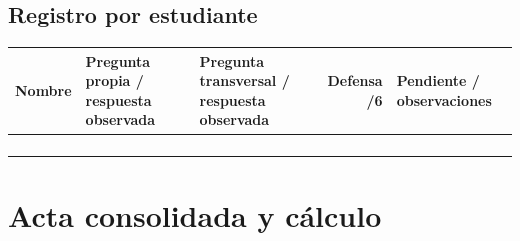 \documentclass[10pt, a4paper]{article}
\begin{document}
\subsection*{Registro por estudiante}

\begingroup
\scriptsize
\setlength{\tabcolsep}{3.5pt}
\renewcommand{\arraystretch}{1.85}
\noindent\begin{tabularx}{\textwidth}{|>{\hsize=0.75\hsize\raggedright\arraybackslash}X|>{\hsize=1.20\hsize\raggedright\arraybackslash}X|>{\hsize=1.20\hsize\raggedright\arraybackslash}X|r|>{\hsize=0.85\hsize\raggedright\arraybackslash}X|}
\hline
\rowcolor{ucbblue!15}
\textbf{Nombre} & \textbf{Pregunta propia / respuesta observada} & \textbf{Pregunta transversal / respuesta observada} & \textbf{Defensa /6} & \textbf{Pendiente / observaciones} \\ \hline
& & & & \\[0.35cm] \hline
& & & & \\[0.35cm] \hline
& & & & \\[0.35cm] \hline
& & & & \\[0.35cm] \hline
\end{tabularx}
\endgroup

\section{Acta consolidada y cálculo}
\end{document}
